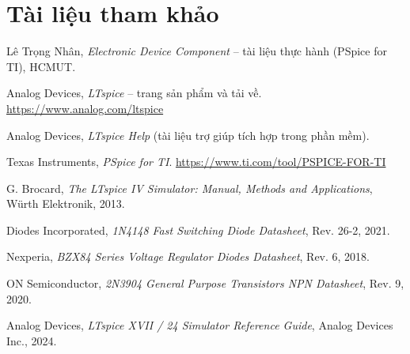 \documentclass[12pt,a4paper]{article}
\begin{document}
\section*{Tài liệu tham khảo}
\begin{enumerate}[label={[\arabic*]}]
  \item Lê Trọng Nhân, \textit{Electronic Device Component} -- tài liệu thực hành (PSpice for TI), HCMUT.
  \item Analog Devices, \textit{LTspice} -- trang sản phẩm và tải về. \url{https://www.analog.com/ltspice}
  \item Analog Devices, \textit{LTspice Help} (tài liệu trợ giúp tích hợp trong phần mềm).
  \item Texas Instruments, \textit{PSpice for TI}. \url{https://www.ti.com/tool/PSPICE-FOR-TI}
  \item G. Brocard, \textit{The LTspice IV Simulator: Manual, Methods and Applications}, Würth Elektronik, 2013.
  \item Diodes Incorporated, \textit{1N4148 Fast Switching Diode Datasheet}, Rev. 26-2, 2021.
  \item Nexperia, \textit{BZX84 Series Voltage Regulator Diodes Datasheet}, Rev. 6, 2018.
  \item ON Semiconductor, \textit{2N3904 General Purpose Transistors NPN Datasheet}, Rev. 9, 2020.
  \item Analog Devices, \textit{LTspice XVII / 24 Simulator Reference Guide}, Analog Devices Inc., 2024.
\end{enumerate}
\end{document}
